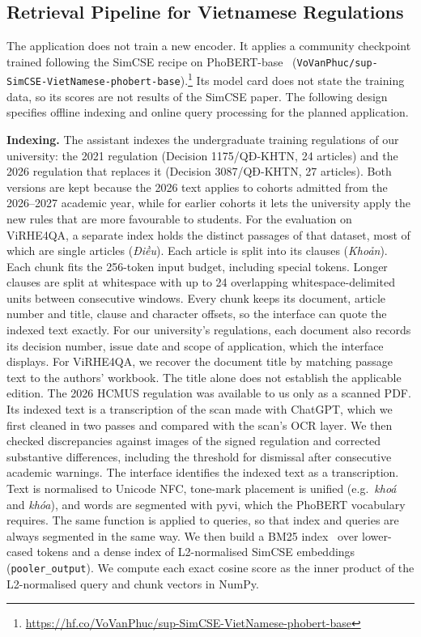 \subsection{Retrieval Pipeline for Vietnamese Regulations}
\label{sec:method-pipeline}

The application does not train a new encoder. It applies a community checkpoint
trained following the SimCSE recipe on PhoBERT-base~\cite{nguyen-tuan-nguyen-2020-phobert}
(\texttt{VoVanPhuc/sup-SimCSE-VietNamese-phobert-base}).\footnote{\url{https://hf.co/VoVanPhuc/sup-SimCSE-VietNamese-phobert-base}}
Its model card does not state the training data, so its scores are not results
of the SimCSE paper. The following design specifies offline indexing and online
query processing for the planned application.

\textbf{Indexing.} The assistant indexes the undergraduate training
regulations of our university: the 2021 regulation (Decision 1175/QĐ-KHTN, 24
articles) and the 2026 regulation that replaces it (Decision 3087/QĐ-KHTN, 27
articles). Both versions are kept because the 2026 text applies to cohorts
admitted from the 2026--2027 academic year, while for earlier cohorts it lets
the university apply the new rules that are more favourable to students. For the evaluation on
ViRHE4QA, a separate index holds the distinct passages of that dataset, most of
which are single articles (\emph{Điều}). Each article is split into its
clauses (\emph{Khoản}).
Each chunk fits the 256-token input budget,
including special tokens. Longer clauses are split at whitespace with up to
24 overlapping whitespace-delimited units between consecutive windows.
Every chunk keeps its document, article number and title, clause and character
offsets, so the interface can quote the indexed text exactly. For our
university's regulations, each document also records its decision number,
issue date and scope of application, which the interface displays. For
ViRHE4QA, we recover the document title by matching passage text to the
authors' workbook. The title alone does not establish the applicable edition.
The 2026 HCMUS regulation was available to us only as a
scanned PDF. Its indexed text is a transcription of the scan made with ChatGPT,
which we first cleaned in two passes and compared with the scan's OCR layer.
We then checked discrepancies against images of the signed regulation and
corrected substantive differences, including the threshold for dismissal
after consecutive academic warnings. The interface identifies the indexed
text as a transcription. Text is normalised to
Unicode NFC, tone-mark placement is unified (e.g.\ \emph{khoá} and \emph{khóa}),
and words are segmented with pyvi, which the PhoBERT vocabulary requires. The
same function is applied to queries, so that index and queries are always
segmented in the same way. We then build a BM25 index~\cite{Robertson_2009}
over lower-cased tokens and a dense index of L2-normalised SimCSE embeddings
(\texttt{pooler\_output}). We compute each exact cosine score as the inner
product of the L2-normalised query and chunk vectors in NumPy.

